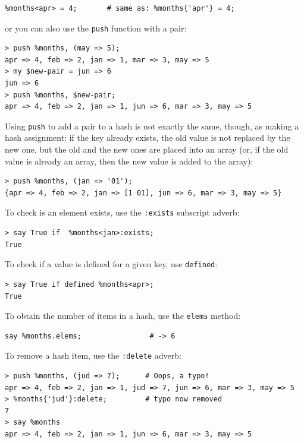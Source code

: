 \begin{verbatim}
%months<apr> = 4;       # same as: %months{'apr'} = 4;
\end{verbatim}

or you can also use the {\tt push} function with a pair:

\begin{verbatim}
> push %months, (may => 5);
apr => 4, feb => 2, jan => 1, mar => 3, may => 5
> my $new-pair = jun => 6
jun => 6
> push %months, $new-pair;
apr => 4, feb => 2, jan => 1, jun => 6, mar => 3, may => 5
\end{verbatim}
%

Using {\tt push} to add a pair to a hash is not exactly the same, 
though, as making a hash assignment: if the key already 
exists, the old value is not replaced by the new one, but 
the old and the new ones are placed into an array (or, 
if the old value is already an array, then the new value 
is added to the array):

\begin{verbatim}
> push %months, (jan => '01');
{apr => 4, feb => 2, jan => [1 01], jun => 6, mar => 3, may => 5}
\end{verbatim}

To check is an element exists, use the {\tt :exists} 
subscript adverb:
\begin{verbatim}
> say True if  %months<jan>:exists;
True
\end{verbatim}

To check if a value is defined for a given key, 
use {\tt defined}:

\begin{verbatim}
> say True if defined %months<apr>;
True
\end{verbatim}
%

To obtain the number of items in a hash, use the {\tt elems}
method:

\begin{verbatim}
say %months.elems;                # -> 6
\end{verbatim}

To remove a hash item, use the {\tt :delete} adverb:

\begin{verbatim}
> push %months, (jud => 7);      # Oops, a typo!
apr => 4, feb => 2, jan => 1, jud => 7, jun => 6, mar => 3, may => 5
> %months{'jud'}:delete;         # typo now removed
7
> say %months
apr => 4, feb => 2, jan => 1, jun => 6, mar => 3, may => 5
\end{verbatim}


